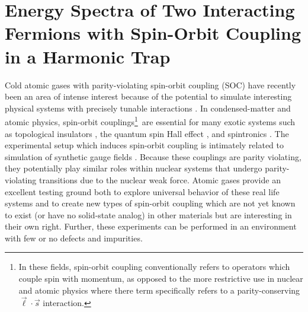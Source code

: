 \chapter{\label{chap:SOC}Energy Spectra of Two Interacting Fermions with Spin-Orbit Coupling in a Harmonic Trap}


Cold atomic gases with parity-violating spin-orbit coupling (SOC) have recently been an area of intense interest because of the potential to simulate interesting physical systems with precisely tunable interactions \cite{nature11841}. In condensed-matter and atomic physics, spin-orbit couplings\footnote{In these fields, spin-orbit coupling conventionally refers to operators which couple spin with momentum, as opposed to the more restrictive use in nuclear and atomic physics where there term specifically refers to a parity-conserving $\vec{\ell}\cdot \vec{s}$ interaction.}\ are essential for many exotic systems such as topological insulators \cite{das2013engineering,PhysRevLett.105.255302}, the quantum spin Hall effect \cite{nature12185}, and spintronics \cite{RevModPhys.76.323}. The experimental setup which induces spin-orbit coupling is intimately related to simulation of synthetic gauge fields \cite{RevModPhys.83.1523,hamner2014dicke,Lin:2009zzb,Bermudez:2011db}. Because these couplings are parity violating, they potentially play similar roles within nuclear systems that undergo parity-violating transitions due to the nuclear weak force.  Atomic gases provide an excellent testing ground both to explore universal behavior of these real life systems and to create new types of spin-orbit coupling which are not yet known to exist (or have no solid-state analog) in other materials but are interesting in their own right. Further, these experiments can be performed in an environment with few or no defects and impurities.


